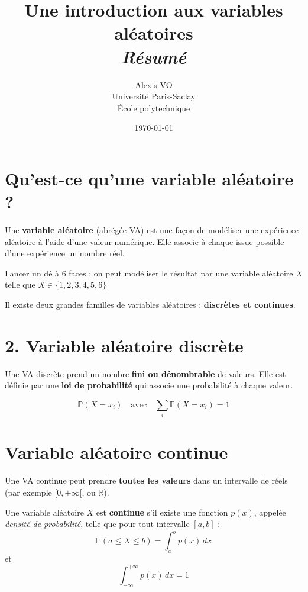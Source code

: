 \documentclass[11pt]{article}
\title{\Huge{\textbf{Une introduction aux variables aléatoires}}\\ \medskip
      \Huge{\textit{Résumé}}\vspace*{0.7cm}}
\author{\LARGE{Alexis VO}\vspace{1cm}\\ \medskip
      Université Paris-Saclay\\École polytechnique}
\date{\vspace{0.2cm}\today}
\begin{document}
\maketitle
\newpage

\section{Qu'est-ce qu'une variable aléatoire ?}

Une \textbf{variable aléatoire} (abrégée VA) est une façon de modéliser une expérience aléatoire à l’aide d’une valeur numérique. Elle associe à chaque issue possible d’une expérience un nombre réel.

\begin{tcolorbox}[colback=green!5!white, colframe=green!50!black, title=Exemple (discret)]
Lancer un dé à 6 faces : on peut modéliser le résultat par une variable aléatoire \( X \) telle que \( X \in \{1,2,3,4,5,6\} \)
\end{tcolorbox}

Il existe deux grandes familles de variables aléatoires : \textbf{discrètes et continues}.

\section*{2. Variable aléatoire discrète}

Une VA discrète prend un nombre \textbf{fini ou dénombrable} de valeurs. Elle est définie par une \textbf{loi de probabilité} qui associe une probabilité à chaque valeur.

\[
\boxed{
\mathbb{P}(X = x_i)
\quad \text{avec} \quad \sum_i \mathbb{P}(X = x_i) = 1
}
\]

\section{Variable aléatoire continue}

Une VA continue peut prendre \textbf{toutes les valeurs} dans un intervalle de réels (par exemple \( [0, +\infty[ \), ou \( \mathbb{R} \)).

\begin{tcolorbox}[colback=red!5!white, colframe=red!50!black, title=Définition]
Une variable aléatoire \( X \) est \textbf{continue} s’il existe une fonction \( p(x) \), appelée \textit{densité de probabilité}, telle que pour tout intervalle \( [a,b] \) :
\[
\boxed{
\mathbb{P}(a \leq X \leq b) = \int_a^b p(x)\, dx
}
\]
\center et
\[
\boxed{
\int_{-\infty}^{+\infty} p(x)\, dx = 1
}
\]
\end{tcolorbox}
\end{document}
